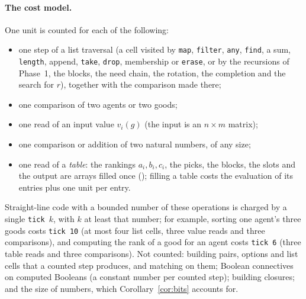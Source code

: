 \documentclass[runningheads,11pt]{llncs}
\begin{document}
\paragraph{The cost model.} One unit is counted for each of the following:
\begin{itemize}
\item one step of a list traversal (a cell visited by \texttt{map}, \texttt{filter}, \texttt{any}, \texttt{find}, a sum, \texttt{length}, append, \texttt{take}, \texttt{drop}, membership or \texttt{erase}, or by the recursions of Phase~1, the blocks, the need chain, the rotation, the completion and the search for $r$), together with the comparison made there;
\item one comparison of two agents or two goods;
\item one read of an input value $v_i(g)$ (the input is an $n\times m$ matrix);
\item one comparison or addition of two natural numbers, of any size;
\item one read of a \emph{table}: the rankings $a_i,b_i,c_i$, the picks, the blocks, the slots and the output are arrays filled once (); filling a table costs the evaluation of its entries plus one unit per entry.
\end{itemize}
Straight-line code with a bounded number of these operations is charged by a single \texttt{tick~$k$}, with $k$ at least that number; for example, sorting one agent's three goods costs \texttt{tick 10} (at most four list cells, three value reads and three comparisons), and computing the rank of a good for an agent costs \texttt{tick 6} (three table reads and three comparisons). Not counted: building pairs, options and list cells that a counted step produces, and matching on them; Boolean connectives on computed Booleans (a constant number per counted step); building closures; and the size of numbers, which Corollary~\ref{cor:bits} accounts for.
\end{document}
